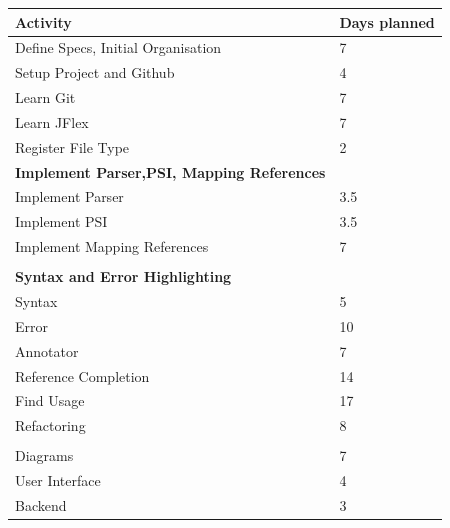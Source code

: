 \documentclass{l3proj}
\begin{document}
\begin{center}
    \begin{tabular}{ | l | l |}
    \hline
     \textbf{Activity} & \textbf{Days planned}  \\ \hline
    Define Specs, Initial Organisation & 7     \\ \hline
    Setup Project and Github & 4   \\ \hline
    Learn Git & 7  \\ \hline
    Learn JFlex & 7 \\ \hline
    Register File Type & 2 \\ \hline
    \textbf {Implement Parser,PSI, Mapping References} & \\ \hline
    Implement Parser & 3.5\\ \hline
    Implement PSI & 3.5\\ \hline
    Implement Mapping References & 7\\ \hline
    & \\ \hline
    \textbf{Syntax and Error Highlighting} &\\ \hline
    Syntax & 5 \\ \hline
    Error & 10 \\ \hline
    Annotator & 7 \\ \hline
    Reference Completion & 14 \\ \hline
    Find Usage & 17 \\ \hline
    Refactoring & 8 \\ \hline
    & \\ \hline
    Diagrams & 7 \\ \hline
    User Interface & 4 \\ \hline
    Backend & 3 \\ \hline
    \end{tabular}
\end{center}
\end{document}
